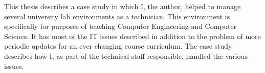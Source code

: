 



This thesis describes a case study in which I, the author, helped to manage several university lab environments as a technician.  This environment is specifically for purposes of teaching Computer Engineering and Computer Science.  It has most of the IT issues described in addition to the problem of more periodic updates for an ever changing course curriculum.  The case study describes how I, as part of the technical staff responsible, handled the various issues.
